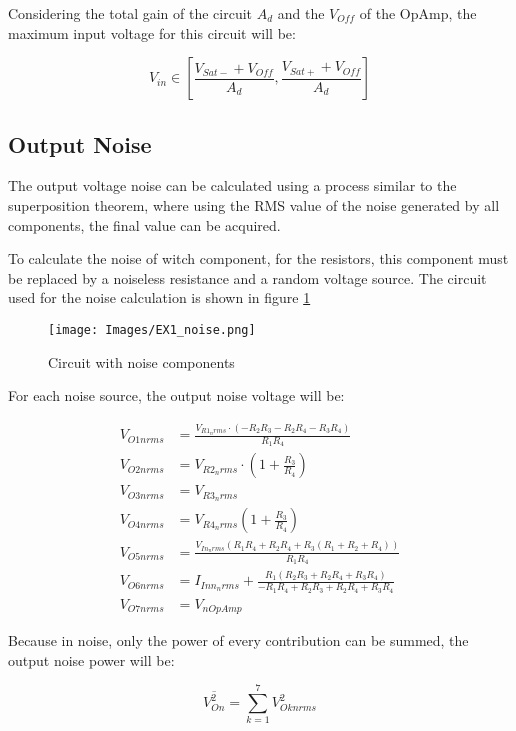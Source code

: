 Considering the total gain of the circuit $A_d$ and the $V_{Off}$ of the OpAmp, the maximum input voltage for this circuit will be:

\begin{equation}
   V_{in} \in [\frac{V_{Sat-} + V_{Off}}{A_d}, \frac{V_{Sat+} + V_{Off}}{A_d} ]
\end{equation}

\subsection{Output Noise}

The output voltage noise can be calculated using a process similar to the superposition theorem, where using the RMS value of the noise generated by all components, the final value can be acquired. 

To calculate the noise of witch component, for the resistors, this component must be replaced by a noiseless resistance and a random voltage source. The circuit used for the noise calculation is shown in figure \ref{Ex1noise}

\begin{figure}[H]
    \centering
    \texttt{[image: Images/EX1\_noise.png]}
    \caption{Circuit with noise components}
    \label{Ex1noise}
\end{figure}

For each noise source, the output noise voltage will be:

\begin{equation}
    \begin{aligned}
        V_{O1nrms} &= \frac{V_{R1_nrms} \cdot \left(- R_{2} R_{3} - R_{2} R_{4} - R_{3} R_{4}\right)}{R_{1} R_{4}} \\
        V_{O2nrms} &= V_{R2_nrms} \cdot \left(1 + \frac{R_{3}}{R_{4}}\right)  \\
        V_{O3nrms} &= V_{R3_nrms}\\
        V_{O4nrms} &= V_{R4_nrms} \left(1 + \frac{R_{3}}{R_{4}} \right)\\
        V_{O5nrms} &= \frac{V_{In_nrms} \left(R_{1} R_{4} + R_{2} R_{4} + R_{3} \left(R_{1} + R_{2} + R_{4}\right)\right)}{R_{1} R_{4}}\\
        V_{O6nrms} &= I_{Inn_nrms} + \frac{R_{1} \left(R_{2} R_{3} + R_{2} R_{4} + R_{3} R_{4}\right)}{- R_{1} R_{4} + R_{2} R_{3} + R_{2} R_{4} + R_{3} R_{4}} \\
        V_{O7nrms} &= V_{nOpAmp}
    \end{aligned}
\end{equation}

Because in noise, only the power of every contribution can be summed, the output noise power will be:

\begin{equation}
    \overline{V_{On}^2} = \sum_{k = 1}^{7} V_{Oknrms}^2
\end{equation}